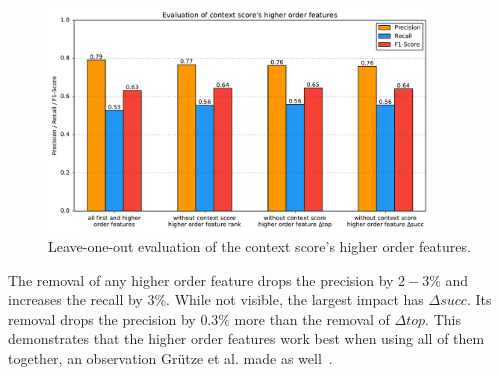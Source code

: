 \begin{figure}[H]
	\centering
	\includegraphics[width=0.9\textwidth]{img/higher_order_eval_context}
	\caption{Leave-one-out evaluation of the context score's higher order features.}
	\label{ho_eval_context}
\end{figure}
The removal of any higher order feature drops the precision by $2-3\%$ and increases the recall by $3\%$. While not visible, the largest impact has $\Delta succ$. Its removal drops the precision by $0.3\%$ more than the removal of $\Delta top$. This demonstrates that the higher order features work best when using all of them together, an observation Grütze et al. made as well\ \cite{coheel}.

